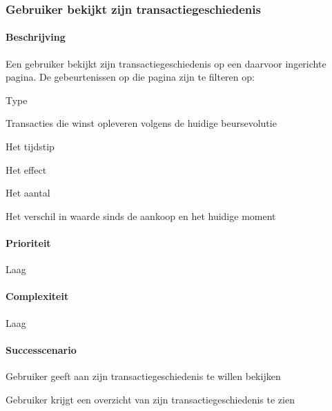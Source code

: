 \subsubsection{Gebruiker bekijkt zijn transactiegeschiedenis}
\begin{compact}
\paragraph{Beschrijving} Een gebruiker bekijkt zijn transactiegeschiedenis op een daarvoor ingerichte pagina. De gebeurtenissen op die pagina zijn te filteren op:
\begin{itemize_compact}
	\item Type
	\item Transacties die winst opleveren volgens de huidige beursevolutie
	\item Het tijdstip
	\item Het effect
	\item Het aantal
	\item Het verschil in waarde sinds de aankoop en het huidige moment
\end{itemize_compact}
\paragraph{Prioriteit}Laag
\paragraph{Complexiteit}Laag
\paragraph{Successcenario}
\begin{enumerate_compact}
 \item Gebruiker geeft aan zijn transactiegeschiedenis te willen bekijken
 \item Gebruiker krijgt een overzicht van zijn transactiegeschiedenis te zien
\end{enumerate_compact}
\end{compact}

